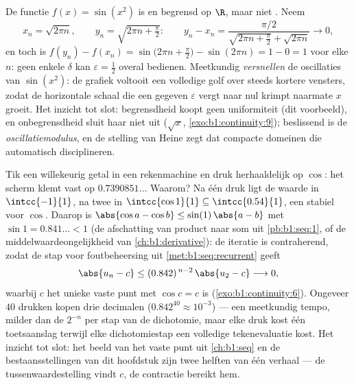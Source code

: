 \begin{example}\label{ex:b1:continuity:sinx2}
De functie $f(x) = \sin(x^2)$ is  en begrensd op $\R$, maar niet
. Neem
\[
x_n = \sqrt{2\pi n}, \qquad y_n = \sqrt{2\pi n + \tfrac\pi2}:
\qquad
y_n - x_n = \frac{\pi/2}{\sqrt{2\pi n + \frac\pi2} +
\sqrt{2\pi n}} \longrightarrow 0 ,
\]
en toch is $f(y_n) - f(x_n) = \sin\bigl(2\pi n + \frac\pi2\bigr) -
\sin(2\pi n) = 1 - 0 = 1$ voor elke $n$: geen enkele $\delta$ kan
$\varepsilon = \frac12$ overal bedienen. Meetkundig \emph{versnellen} de
oscillaties van $\sin(x^2)$: de grafiek voltooit een volledige golf over
steeds kortere vensters, zodat de horizontale schaal die een gegeven
$\varepsilon$ vergt naar nul krimpt naarmate $x$ groeit. Het inzicht tot
slot: begrensdheid koopt geen uniformiteit (dit voorbeeld), en
onbegrensdheid sluit haar niet uit ($\sqrt x$,
\cref{exo:b1:continuity:9}); beslissend is de \emph{oscillatiemodulus},
en de stelling van Heine zegt dat compacte domeinen die automatisch
disciplineren.
\end{example}

\begin{example}\label{ex:b1:continuity:cositeration}
Tik een willekeurig getal in een rekenmachine en druk herhaaldelijk op
$\cos$: het scherm klemt vast op $0.7390851\dots$ Waarom? Na één druk
ligt de waarde in $\intcc{-1}{1}$, na twee in $\intcc{\cos 1}{1}
\subseteq \intcc{0.54}{1}$, een stabiel  voor $\cos$. Daarop is
$\abs{\cos a - \cos b} \leq \sin(1)\,\abs{a - b}$ met $\sin 1 =
0.841\dots < 1$ (de afschatting van product naar som uit
\cref{pb:b1:seq:1}, of de middelwaardeongelijkheid van
\cref{ch:b1:derivative}): de iteratie is contraherend, zodat de stap voor
foutbeheersing uit \cref{met:b1:seq:recurrent} geeft
\[
\abs{u_n - c} \leq (0.842)^{\,n-2}\,\abs{u_2 - c}
\longrightarrow 0 ,
\]
waarbij $c$ het unieke vaste punt met $\cos c = c$ is
(\cref{exo:b1:continuity:6}). Ongeveer $40$ drukken kopen drie decimalen
($0.842^{40} \approx 10^{-3}$) --- een meetkundig tempo, milder dan de
$2^{-n}$ per stap van de dichotomie, maar elke druk kost één
toetsaanslag terwijl elke dichotomiestap een volledige tekenevaluatie
kost. Het inzicht tot slot: het beeld van het vaste punt uit
\cref{ch:b1:seq} en de bestaansstellingen van dit hoofdstuk zijn twee
helften van één verhaal --- de tussenwaardestelling vindt $c$, de
contractie bereikt hem.
\end{example}

